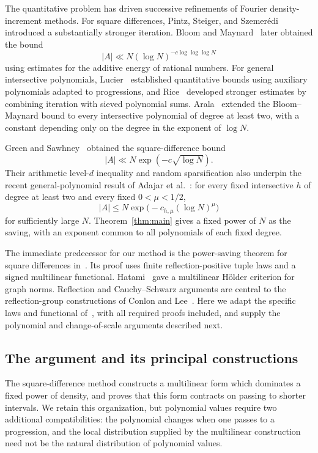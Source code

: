 The quantitative problem has driven successive refinements of Fourier
density-increment methods. For square differences, Pintz, Steiger, and
Szemer\'edi~\cite{PintzSteigerSzemeredi1988} introduced a substantially
stronger iteration. Bloom and Maynard~\cite{BloomMaynard2022} later
obtained the bound
\[
 |A|\ll N(\log N)^{-c\log\log\log N}
\]
using estimates for the additive energy of rational numbers.
For general intersective polynomials, Lucier~\cite{Lucier2006} established
quantitative bounds using auxiliary polynomials adapted to progressions,
and Rice~\cite{Rice2019} developed stronger estimates by combining
iteration with sieved polynomial sums.
Arala~\cite{Arala2024} extended the Bloom--Maynard bound to every
intersective polynomial of degree at least two, with a constant depending
only on the degree in the exponent of $\log N$.

Green and Sawhney~\cite[Theorem~1.1]{GreenSawhney2025} obtained the
square-difference bound
\[
 |A|\ll N\exp(-c\sqrt{\log N}).
\]
Their arithmetic
level-$d$ inequality and random sparsification also underpin the recent
general-polynomial result of Adajar et al.~\cite[Theorem~1.1]{AdajarEtAl2026}:
for every fixed intersective $h$ of degree at least two and every fixed
$0<\mu<1/2$,
\[
 |A|\le N\exp\bigl(-c_{h,\mu}(\log N)^\mu\bigr)
\]
for sufficiently large $N$. Theorem~\ref{thm:main} gives a fixed power
of $N$ as the saving, with an exponent common to all polynomials of each
fixed degree.

The immediate predecessor for our method is the power-saving theorem
for square differences in~\cite[Theorem~1.1]{squarepower}. Its proof
uses finite reflection-positive tuple laws and a signed multilinear
functional. Hatami~\cite{Hatami2010} gave a multilinear H\"older criterion
for graph norms. Reflection and Cauchy--Schwarz arguments are central to
the reflection-group constructions of Conlon and Lee~\cite{ConlonLee2017}.
Here we adapt the specific laws and functional of~\cite{squarepower},
with all required proofs included, and supply the polynomial and
change-of-scale arguments described next.

\subsection{The argument and its principal constructions}

The square-difference method constructs a multilinear form
which dominates a fixed power of density, and proves that this form contracts
on passing to shorter intervals. We retain this organization, but polynomial
values require two additional compatibilities: the polynomial changes when
one passes to a progression, and the local distribution supplied by the
multilinear construction need not be the natural distribution of polynomial
values.

